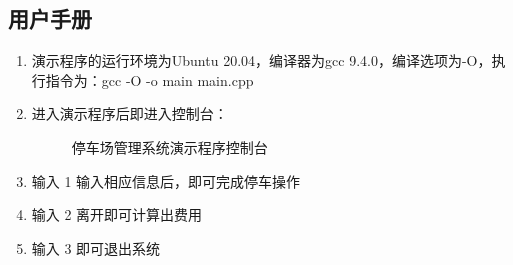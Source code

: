 \documentclass[UTF8,titlepage]{ctexart}
\numberwithin{figure}{section}
\begin{document}
\subsection{用户手册}

\begin{enumerate}
    \item 演示程序的运行环境为Ubuntu 20.04，编译器为gcc 9.4.0，编译选项为-O，执行指令为：gcc -O -o main main.cpp
    \item 进入演示程序后即进入控制台：{
        \begin{figure}[H]
        \centering
         \caption{停车场管理系统演示程序控制台}
         \label{}
        \end{figure}
    }
    \item 输入 1 输入相应信息后，即可完成停车操作
    \item 输入 2 离开即可计算出费用
    \item 输入 3 即可退出系统
\end{enumerate}
\end{document}

